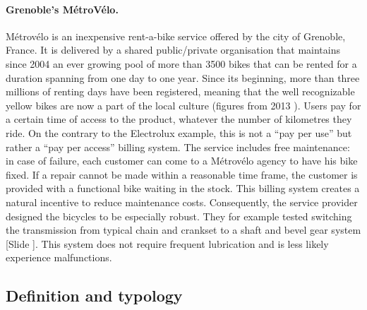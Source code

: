 \documentclass{article}
\newcounter{slide}
\begin{document}
\paragraph{Grenoble's MétroVélo.}\label{MetroVelo} Métrovélo is an inexpensive rent-a-bike service offered by the city of Grenoble, France. It is delivered by a shared public/private organisation that maintains since 2004 an ever growing pool of more than 3500 bikes that can be rented for a duration spanning from one day to one year. Since its beginning, more than three millions of renting days have been registered, meaning that the well recognizable yellow bikes are now a part of the local culture (figures from 2013 \cite{bonvoisinOpennessSupportiveParadigm2013}). Users pay for a certain time of access to the product, whatever the number of kilometres they ride. On the contrary to the Electrolux example, this is not a ``pay per use'' but rather a ``pay per access'' billing system. The service includes free maintenance: in case of failure, each customer can come to a Métrovélo agency to have his bike fixed. If a repair cannot be made within a reasonable time frame, the customer is provided with a functional bike waiting in the stock. This billing system creates a natural incentive to reduce maintenance costs. Consequently,  the service provider designed the bicycles to be especially robust. They for example tested switching the transmission from typical chain and crankset to a shaft and bevel gear system {\color{blue}[Slide ]}. This system does not require frequent lubrication and is less likely experience malfunctions. 

\subsection{Definition and typology}
\label{sec:pssDefinition}
\end{document}
